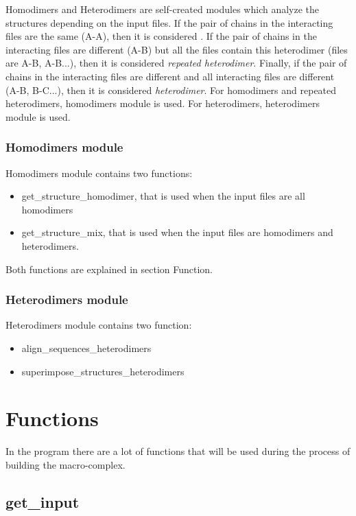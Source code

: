 \documentclass[a4paper,12pt]{report}
\begin{document}
Homodimers and Heterodimers are self-created modules which analyze the structures depending on the input files. If the pair of chains in the interacting files are the same (A-A), then it is considered . If the pair of chains in the interacting files are different (A-B) but all the files contain this heterodimer (files are A-B, A-B...), then it is considered \textit{repeated heterodimer}. Finally, if the pair of chains in the interacting files are different and all interacting files are different (A-B, B-C...), then it is considered \textit{heterodimer}. For homodimers and repeated heterodimers, homodimers module is used. For heterodimers, heterodimers module is used.

\subsubsection{Homodimers module}

Homodimers module contains two functions:

\begin{itemize}
 \item get\_structure\_homodimer, that is used when the input files are all homodimers
 \item get\_structure\_mix, that is used when the input files are homodimers and heterodimers.
\end{itemize}

\noindent
Both functions are explained in section Function.

\subsubsection{Heterodimers module}

Heterodimers module contains two function:

\begin{itemize}
 \item align\_sequences\_heterodimers
 \item superimpose\_structures\_heterodimers
\end{itemize}


\section{Functions}

In the program there are a lot of functions that will be used during the process of building the macro-complex.

\subsection{get\_input}
\end{document}
